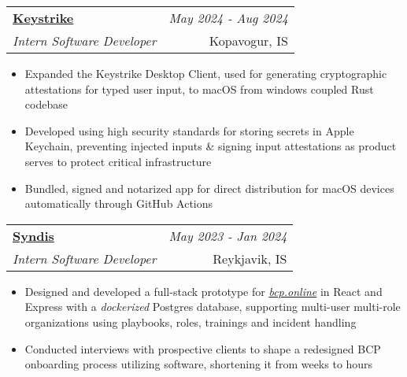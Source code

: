 \documentclass{article}
\makeatletter
\newcommand{\resumeSubheading}[4]{
\vspace{0.5mm}
    \begin{tabular*}{0.98\textwidth}[t]{l@{\extracolsep{\fill}}r}
        \textbf{#1} & \textit{\footnotesize{#4}} \\
        \textit{\footnotesize{#3}} &  \footnotesize{#2}\\
    \end{tabular*}
    \vspace{-2.4mm}
}
\newcommand{\resumeItemListStart}{\begin{itemize}[leftmargin=*,labelsep=1mm,itemsep=0.5mm]}
\newcommand{\resumeItemListEnd}{\end{itemize}\vspace{-2mm}}
\makeatother
\begin{document}
  \resumeSubheading
      {\href{https://keystrike.com}{Keystrike}}{Kopavogur, IS}
	  {Intern Software Developer}{May 2024 - Aug 2024}
      \resumeItemListStart
	    \item Expanded the Keystrike Desktop Client, used for generating cryptographic attestations for typed user input, to macOS from windows coupled Rust codebase



		\item Developed using high security standards for storing secrets in Apple Keychain, preventing injected inputs \& signing input attestations as product serves to protect critical infrastructure

		\item Bundled, signed and notarized app for direct distribution for macOS devices automatically through GitHub Actions 
      \resumeItemListEnd 

  \resumeSubheading
    {\href{https://www.syndis.is}{Syndis}}{Reykjavik, IS}
    {Intern Software Developer}{May 2023 - Jan 2024}
    \resumeItemListStart
\item Designed and developed a full-stack prototype for \href{https://bcp.online}{\emph{bcp.online}} in React and Express with a \emph{dockerized} Postgres database, supporting 
			multi-user multi-role organizations using playbooks, roles, trainings and incident handling

	  \item Conducted interviews with prospective clients to shape a redesigned BCP onboarding process utilizing software, shortening it from weeks to hours
    \resumeItemListEnd
	
\end{document}
